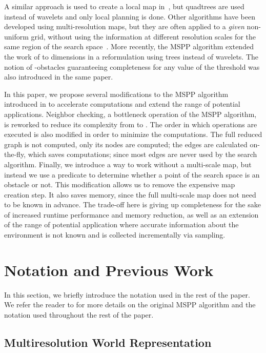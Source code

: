 \documentclass[letterpaper, 10 pt, conference]{ieeeconf}
\theoremstyle{definition}
\begin{document}
A similar approach is used to create a local map in~\cite{behnke2004local}, but quadtrees are used instead of wavelets and only local planning is done. Other algorithms have been developed using multi-resolution maps, but they are often applied to a \textit{given} non-uniform grid, without using the information at different resolution scales for the same region of the search space~\cite{ferguson2006using,petres2007path}.
More recently, the MSPP algorithm \cite{hauer2015multi} extended the work of \cite{cowlagi2011hierarchical} to  dimensions in a reformulation using  trees instead of wavelets.
The notion of -obstacles guaranteeing completeness for any value of the threshold  was also introduced in the same paper.

In this paper, we propose several modifications to the MSPP algorithm introduced in \cite{hauer2015multi} to accelerate computations and extend the range of potential applications.
Neighbor checking, a bottleneck operation of the MSPP algorithm, is reworked to reduce its complexity from  to .
The order in which operations are executed is also modified in order to minimize the computations.
The full reduced graph is not computed, only its nodes are computed;
the edges are calculated on-the-fly, which saves computations; since most edges are never used by the search algorithm.
Finally, we introduce a way to work without a multi-scale map, but  instead we use a predicate to determine whether a point of the search space is an obstacle or not.
This modification allows us to remove the expensive map creation step.
It also saves memory, since the full multi-scale map does not need to be known in advance. The trade-off here is giving up completeness for the sake of increased runtime performance and memory reduction, as well as an extension of the range of potential application where accurate information about the environment is not known and is collected incrementally via sampling.




\section{Notation and Previous Work} \label{sec:notations}

In this section, we briefly introduce the notation used in the rest of the paper.  We refer the reader to \cite{hauer2015multi} for more details on the original MSPP algorithm and the notation used throughout the rest of the paper.

\subsection{Multiresolution World Representation}
\end{document}
